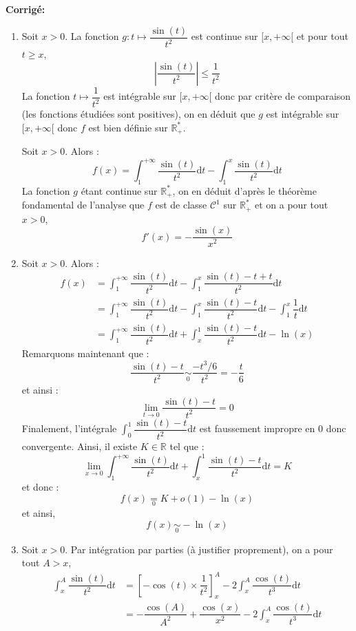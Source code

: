 \documentclass[a4paper,twoside,french,10pt]{VcCours}
\newcommand{\dt}{\text{d}t}
\newcommand{\corr}{\textbf{Corrigé:}}
\begin{document}
\corr \begin{enumerate}
\item Soit $x>0$. La fonction $g : t \mapsto \dfrac{\sin(t)}{t^2}$ est continue sur $[x, + \infty[$ et pour tout $t \geq x$,
$$ \left\vert \dfrac{\sin(t)}{t^2} \right\vert \leq \dfrac{1}{t^2}$$
La fonction $t \mapsto \dfrac{1}{t^2}$ est intégrable sur $[x, + \infty[$ donc par critère de comparaison (les fonctions étudiées sont positives), on en déduit que $g$ est intégrable sur $[x, + \infty[$ donc $f$ est bien définie sur $\mathbb{R}_+^{*}$.


\medskip

\noindent Soit $x>0$. Alors :
$$ f(x) = \int_{1}^{+ \infty} \dfrac{\sin(t)}{t^2} \dt - \int_{1}^{x} \dfrac{\sin(t)}{t^2} \dt$$
La fonction $g$ étant continue sur $\mathbb{R}_+^{*}$, on en déduit d'après le théorème fondamental de l'analyse que $f$ est de classe $\mathcal{C}^1$ sur $\mathbb{R}_+^{*}$ et on a pour tout $x>0$,
$$ f'(x) = - \dfrac{\sin(x)}{x^2}$$
\item Soit $x>0$. Alors :
\begin{align*}
 f(x) & = \int_{1}^{+ \infty} \dfrac{\sin(t)}{t^2} \dt - \int_{1}^{x} \dfrac{\sin(t)-t+t}{t^2} \dt \\
 & = \int_{1}^{+ \infty} \dfrac{\sin(t)}{t^2} \dt - \int_{1}^{x} \dfrac{\sin(t)-t}{t^2} \dt -\int_{1}^x \dfrac{1}{t} \dt \\
& =  \int_{1}^{+ \infty} \dfrac{\sin(t)}{t^2} \dt + \int_{x}^{1} \dfrac{\sin(t)-t}{t^2} \dt  - \ln(x) 
\end{align*}
Remarquons maintenant que :
$$ \dfrac{\sin(t)-t}{t^2} \underset{0}{\sim} \dfrac{-t^3/6}{t^2} = - \dfrac{t}{6}$$
et ainsi :
$$ \lim_{t \rightarrow 0}  \dfrac{\sin(t)-t}{t^2} =0$$
Finalement, l'intégrale $\int_{0}^{1} \dfrac{\sin(t)-t}{t^2} \dt$ est faussement impropre en $0$ donc convergente. Ainsi, il existe $K \in \mathbb{R}$ tel que :
$$ \lim_{x \rightarrow 0}  \int_{1}^{+ \infty} \dfrac{\sin(t)}{t^2} \dt + \int_{x}^{1} \dfrac{\sin(t)-t}{t^2} \dt = K$$
et donc :
$$ f(x) \underset{0}{=} K + o(1) - \ln(x)$$
et ainsi,
$$f(x) \underset{0}{\sim} -\ln(x)$$
\item Soit $x>0$. Par intégration par parties (à justifier proprement), on a pour tout $A>x$,
\begin{align*}
 \int_{x}^A \dfrac{\sin(t)}{t^2} \dt & = \left[- \cos(t) \times \dfrac{1}{t^2} \right]_x^A -2 \int_{x}^A \dfrac{\cos(t)}{t^3} \dt \\
  & = - \dfrac{\cos(A)}{A^2} + \dfrac{\cos(x)}{x^2} -2 \int_{x}^A \dfrac{\cos(t)}{t^3} \dt \\

\end{align*}
\end{enumerate}
\end{document}
